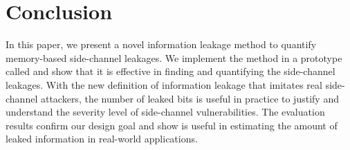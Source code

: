 \section{Conclusion}
In this paper, we present a novel information leakage %
method to
quantify memory-based side-channel leakages. We implement the method in
a prototype called \tool{} and show that it is effective in finding
and quantifying the side-channel leakages. With the new definition of
information leakage that imitates real side-channel attackers, the number of
leaked bits is useful in practice to justify and understand the severity level
of side-channel vulnerabilities. The evaluation results confirm our design goal
and show \tool{} is useful in estimating the amount of leaked information in
real-world applications.
